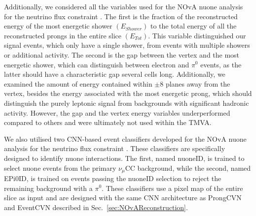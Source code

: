 Additionally, we considered all the variables used for the \gls{NOvA} \gls{nuone} analysis for the neutrino flux constraint \cite{NOVA-doc-56383}. The first is the fraction of the reconstructed energy of the most energetic shower $\left(E_{Shower}\right)$ to the total energy of all the reconstructed prongs in the entire slice $\left(E_{Tot}\right)$. This variable distinguished our signal events, which only have a single shower, from events with multiple showers or additional activity. The second is the gap between the vertex and the most energetic shower, which can distinguish between electron and $\pi^0$ events, as the latter should have a characteristic gap several cells long. Additionally, we examined the amount of energy contained within $\pm8$ planes away from the vertex, besides the energy associated with the most energetic prong, which should distinguish the purely leptonic signal from backgrounds with significant hadronic activity. However, the gap and the vertex energy variables underperformed compared to others and were ultimately not used within the \gls{TMVA}.

We also utilised two \gls{CNN}-based event classifiers developed for the \gls{NOvA} \gls{nuone} analysis for the neutrino flux constraint \cite{NOVA-doc-56383, Nuone_Neutrino2022Poster}. These classifiers are specifically designed to identify \gls{nuone} interactions. The first, named \acrshort{nuoneID}, is trained to select \gls{nuone} events from the primary $\nu_\mu$\gls{CC} background, while the second, named \acrshort{EPi0ID}, is trained on events passing the \acrshort{nuoneID} selection to reject the remaining background with a $\pi^0$. These classifiers use a pixel map of the entire slice as input and are designed with the same \gls{CNN} architecture as ProngCVN and EventCVN described in Sec.~\ref{sec:NOvAReconstruction}.

